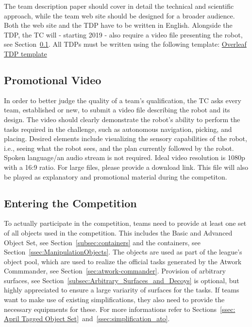 The team description paper should cover in detail the technical and scientific approach, while the team web site should be designed for a broader audience. Both the web site and the TDP have to be written in English. Alongside the TDP, the TC will - starting 2019 - also require a video file presenting the robot, see Section~\ref{ssec:promotional_video}. All TDPs must be written using the following template: \href{https://www.overleaf.com/latex/templates/springer-lecture-notes-in-computer-science/kzwwpvhwnvfj#.WtR5Hy5ua71}{Overleaf TDP template} 

\subsection{Promotional Video}
\label{ssec:promotional_video}
In order to better judge the quality of a team's qualification, the TC asks every team, established or new, to submit a video file describing the robot and its design. The video should clearly demonstrate the robot's ability to perform the tasks required in the challenge, such as autonomous navigation, picking, and placing. Desired elements include visualizing the sensory capabilities of the robot, i.e., seeing what the robot sees, and the plan currently followed by the robot. Spoken language/an audio stream is not required. Ideal video resolution is 1080p with a 16:9 ratio. For large files, please provide a download link.
This file will also be played as explanatory and promotional material during the competiton.

\subsection{Entering the Competition}%
\label{sec:participation}
To actually participate in the competition, teams need to provide at least one set of all objects used in the
competition. This includes the Basic and Advanced Object Set, see Section~\ref{subsec:containers} and the
containers, see Section~\ref{ssec:ManipulationObjects}. The objects are used as part of the league's object pool, which are
used to realize the official tasks generated by the Atwork Commmander, see Section~\ref{sec:atwork-commander}. Provision
of arbitrary surfaces, see Section~\ref{subsec:Arbitrary_Surfaces_and_Decoys} is optional, but highly appreciated to ensure a large variarity of
surfaces for the tasks. If teams want to make use of existing simplifications, they also need to provide the necessary
equipments for these. For more informations refer to Sections~\ref{ssec: April Tagged Object Set}~and~\ref{ssec:simplification_ato}.
